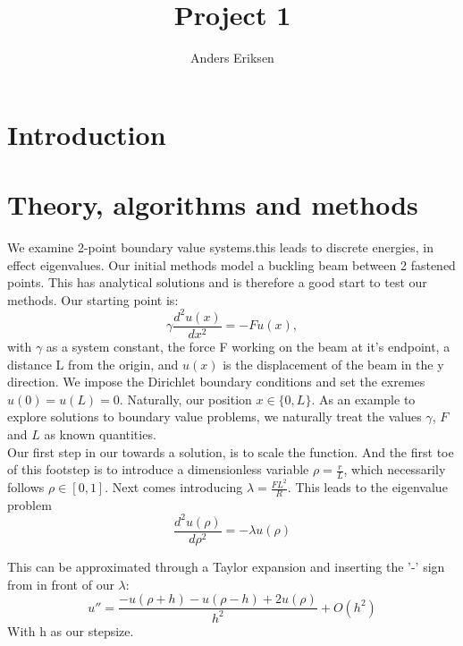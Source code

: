 \documentclass[10pt, twocolumn]{article}
\begin{document}
\title{Project 1}
\author{Anders Eriksen}

\maketitle

\begin{abstract}

\end{abstract}

\section{Introduction}

\section{Theory, algorithms and methods}
We examine  2-point boundary value systems.this leads to discrete energies, in effect eigenvalues. 
Our initial methods model a buckling beam between 2 fastened points. This has analytical solutions 
and is therefore a good start to test our methods. Our starting point is\cite{project2pdf}:
\[
\gamma \frac{d^2 u(x)}{dx^2} = -F u(x),
\]
with $\gamma$ as a system constant, the force F working on the beam at it's endpoint, a distance L 
from the origin, and $u(x)$ is the displacement of the beam in the y direction. We impose the 
Dirichlet boundary conditions and set the exremes $u(0) = u(L) = 0$. Naturally, our position 
$x \in \{ 0, L \}$. As an example to explore solutions to boundary value problems, we naturally 
treat the values $\gamma$, $F$ and $L$ as known quantities. \\

Our first step in our towards a solution, is to scale the function. And the first toe of this 
footstep is to introduce a dimensionless variable $ \rho = \frac{r}{L} $, which necessarily follows 
$\rho \in [0,1]$. Next comes introducing $\lambda = \frac{FL^2}{R}$. This leads to the eigenvalue 
problem
\[
\frac{d^2u(\rho )}{d\rho^2} = -\lambda u(\rho)
\]

This can be approximated through a Taylor expansion and inserting the '-' sign from in front of our 
$\lambda$:
\[
u'' = \frac{-u(\rho + h) - u(\rho - h) + 2u(\rho)}{h^2} + {O}(h^2)
\]
With h as our stepsize.\
\end{document}
